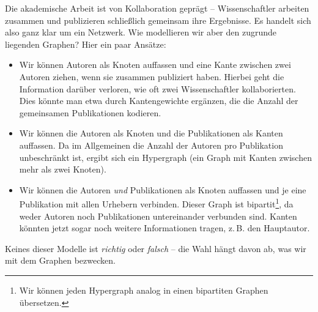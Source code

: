 \begin{example}
    Die akademische Arbeit ist von Kollaboration geprägt -- Wissenschaftler arbeiten zusammen und publizieren schließlich gemeinsam ihre Ergebnisse.
    Es handelt sich also ganz klar um ein Netzwerk.
    Wie modellieren wir aber den zugrunde liegenden Graphen?
    Hier ein paar Ansätze:

    \begin{itemize}
        \item
              Wir können Autoren als Knoten auffassen und eine Kante zwischen zwei Autoren ziehen, wenn sie zusammen publiziert haben.
              Hierbei geht die Information darüber verloren, wie oft zwei Wissenschaftler kollaborierten.
              Dies könnte man etwa durch Kantengewichte ergänzen, die die Anzahl der gemeinsamen Publikationen kodieren.

        \item Wir können die Autoren als Knoten und die Publikationen als Kanten auffassen.
              Da im Allgemeinen die Anzahl der Autoren pro Publikation unbeschränkt ist, ergibt sich ein Hypergraph (ein Graph mit Kanten zwischen mehr als zwei Knoten).

        \item Wir können die Autoren \emph{und} Publikationen als Knoten auffassen und je eine Publikation mit allen Urhebern verbinden.
              Dieser Graph ist bipartit\footnote{Wir können jeden Hypergraph analog in einen bipartiten Graphen übersetzen.}, da weder Autoren noch Publikationen untereinander verbunden sind.
              Kanten könnten jetzt sogar noch weitere Informationen tragen, z.\,B. den Hauptautor.\qedhere
    \end{itemize}
\end{example}

\noindent
Keines dieser Modelle ist \emph{richtig} oder \emph{falsch} -- die Wahl hängt davon ab, was wir mit dem Graphen bezwecken.

